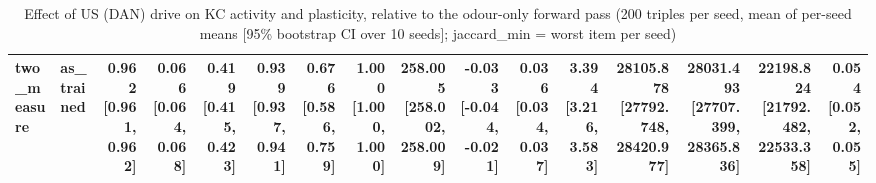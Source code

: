 \begin{table}[t]
\begin{tabular}{llrrrrrrrrrrrrrr}
two\_measure & as\_trained & 0.962 [0.961, 0.962] & 0.066 [0.064, 0.068] & 0.419 [0.415, 0.423] & 0.939 [0.937, 0.941] & 0.676 [0.586, 0.759] & 1.000 [1.000, 1.000] & 258.005 [258.002, 258.009] & -0.033 [-0.044, -0.021] & 0.036 [0.034, 0.037] & 3.394 [3.216, 3.583] & 28105.878 [27792.748, 28420.977] & 28031.493 [27707.399, 28365.836] & 22198.824 [21792.482, 22533.358] & 0.054 [0.052, 0.055] \\
\bottomrule
\end{tabular}
\caption{Effect of US (DAN) drive on KC activity and plasticity, relative to the odour-only forward pass (200 triples per seed, mean of per-seed means [95\% bootstrap CI over 10 seeds]; jaccard\_min = worst item per seed)}
\label{tab:dan_kc_measure}
\end{table}